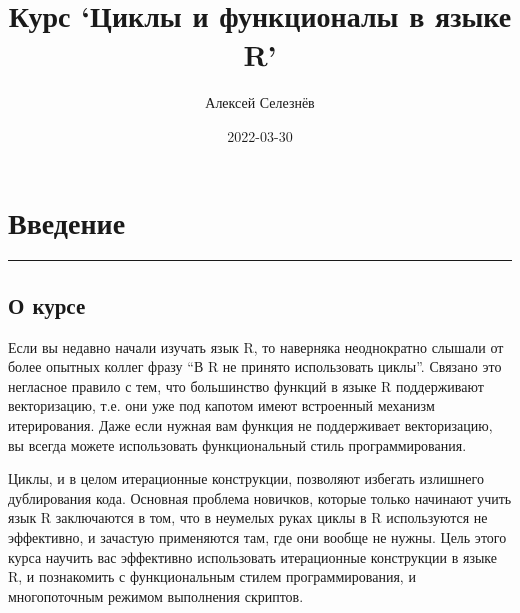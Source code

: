 \documentclass[
]{book}
\title{Курс `Циклы и функционалы в языке R'}
\author{Алексей Селезнёв}
\date{2022-03-30}
\begin{document}
\maketitle

{
\setcounter{tocdepth}{1}
\tableofcontents
}
\hypertarget{ux432ux432ux435ux434ux435ux43dux438ux435}{%
\chapter*{Введение}\label{ux432ux432ux435ux434ux435ux43dux438ux435}}

\begin{center}\rule{0.5\linewidth}{0.5pt}\end{center}

\hypertarget{ux43e-ux43aux443ux440ux441ux435}{%
\section*{О курсе}\label{ux43e-ux43aux443ux440ux441ux435}}

Если вы недавно начали изучать язык R, то наверняка неоднократно слышали от более опытных коллег фразу ``В R не принято использовать циклы''. Связано это негласное правило с тем, что большинство функций в языке R поддерживают векторизацию, т.е. они уже под капотом имеют встроенный механизм итерирования. Даже если нужная вам функция не поддерживает векторизацию, вы всегда можете использовать функциональный стиль программирования.

Циклы, и в целом итерационные конструкции, позволяют избегать излишнего дублирования кода. Основная проблема новичков, которые только начинают учить язык R заключаются в том, что в неумелых руках циклы в R используются не эффективно, и зачастую применяются там, где они вообще не нужны. Цель этого курса научить вас эффективно использовать итерационные конструкции в языке R, и познакомить с функциональным стилем программирования, и многопоточным режимом выполнения скриптов.
\end{document}
